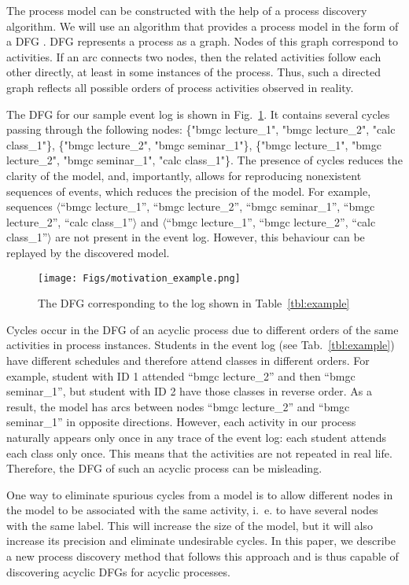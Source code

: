 \documentclass[11pt]{article}
\theoremstyle{definition}
\begin{document}
The process model can be constructed with the help of a process discovery algorithm. 
We will use an algorithm that provides a process model in the form of a DFG \citep{vanderAalst2022}. 
DFG represents a process as a graph.
Nodes of this graph correspond to activities.
If an arc connects two nodes, then the related activities  follow each other directly, at least in some instances of the process. 
Thus, such a directed graph reflects all possible orders of process activities observed in reality.

The DFG for our sample event log is shown in Fig.~\ref{fig:dfg_example}.
It contains several cycles passing through the following nodes: \{"bmgc lecture\_1", "bmgc lecture\_2", "calc class\_1"\}, \{"bmgc lecture\_2", "bmgc seminar\_1"\}, \{"bmgc lecture\_1", "bmgc lecture\_2", "bmgc seminar\_1", "calc class\_1"\}. 
The presence of cycles reduces the clarity of the model, and, importantly, allows for reproducing nonexistent sequences of events, which reduces the precision of the model. 
For example, sequences $\langle$``bmgc lecture\_1'', ``bmgc lecture\_2'', ``bmgc seminar\_1'', ``bmgc lecture\_2'', ``calc class\_1''$\rangle$ and $\langle$``bmgc lecture\_1'', ``bmgc lecture\_2'', ``calc class\_1''$\rangle$ are not present in the event log.
However, this behaviour can be replayed by the discovered model.

\begin{figure}[htb]
    \centering
    \texttt{[image: Figs/motivation\_example.png]}
    \caption{The DFG corresponding to the log shown in Table~\ref{tbl:example}}
    \label{fig:dfg_example}
\end{figure}

Cycles occur in the DFG of an acyclic process due to different orders of the same activities in process instances.  
Students in the event log (see Tab.~\ref{tbl:example}) have different schedules and therefore attend classes in different orders. 
For example, student with ID 1 attended ``bmgc lecture\_2'' and then ``bmgc seminar\_1'', but student with ID 2 have those classes in reverse order. 
As a result, the model has arcs between nodes ``bmgc lecture\_2'' and ``bmgc seminar\_1'' in opposite directions. 
However, each activity in our process naturally appears only once in any trace of the event log: each student attends each class only once.
This means that the activities are not repeated in real life. 
Therefore, the DFG of such an acyclic process can be misleading.

One way to eliminate spurious cycles from a model is to allow different nodes in the model to be associated with the same activity, i.\ e.
to have several nodes with the same label.
This will increase the size of the model, but it will also increase its precision and eliminate undesirable cycles. In this paper, we describe a new process discovery method that follows this approach and is thus capable of discovering acyclic DFGs for acyclic processes.
\end{document}
